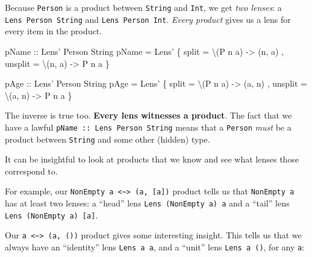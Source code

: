 \documentclass[]{article}
\newenvironment{Shaded}{}{}
\newcommand{\DataTypeTok}[1]{\textcolor[rgb]{0.56,0.13,0.00}{#1}}
\newcommand{\FunctionTok}[1]{\textcolor[rgb]{0.02,0.16,0.49}{#1}}
\newcommand{\NormalTok}[1]{#1}
\newcommand{\OtherTok}[1]{\textcolor[rgb]{0.00,0.44,0.13}{#1}}
\begin{document}
Because \texttt{Person} is a product between \texttt{String} and \texttt{Int},
we get \emph{two lenses}: a \texttt{Lens\textquotesingle{}\ Person\ String} and
\texttt{Lens\textquotesingle{}\ Person\ Int}. \emph{Every product} gives us a
lens for every item in the product.

\begin{Shaded}
\begin{Highlighting}[]
\OtherTok{pName ::} \DataTypeTok{Lens'} \DataTypeTok{Person} \DataTypeTok{String}
\NormalTok{pName }\FunctionTok{=} \DataTypeTok{Lens'}\NormalTok{ \{ split   }\FunctionTok{=}\NormalTok{ \textbackslash{}(}\DataTypeTok{P}\NormalTok{ n a) }\OtherTok{->}\NormalTok{ (n, a)}
\NormalTok{              , unsplit }\FunctionTok{=}\NormalTok{ \textbackslash{}(n, a)  }\OtherTok{->} \DataTypeTok{P}\NormalTok{ n a}
\NormalTok{              \}}

\OtherTok{pAge ::} \DataTypeTok{Lens'} \DataTypeTok{Person} \DataTypeTok{String}
\NormalTok{pAge }\FunctionTok{=} \DataTypeTok{Lens'}\NormalTok{ \{ split   }\FunctionTok{=}\NormalTok{ \textbackslash{}(}\DataTypeTok{P}\NormalTok{ n a) }\OtherTok{->}\NormalTok{ (a, n)}
\NormalTok{             , unsplit }\FunctionTok{=}\NormalTok{ \textbackslash{}(a, n)  }\OtherTok{->} \DataTypeTok{P}\NormalTok{ n a}
\NormalTok{             \}}
\end{Highlighting}
\end{Shaded}

The inverse is true too. \textbf{Every lens witnesses a product}. The fact that
we have a lawful \texttt{pName\ ::\ Lens\textquotesingle{}\ Person\ String}
means that a \texttt{Person} \emph{must} be a product between \texttt{String}
and some other (hidden) type.

It can be insightful to look at products that we know and see what lenses those
correspond to.

For example, our
\texttt{NonEmpty\ a\ \textless{}\textasciitilde{}\textgreater{}\ (a,\ {[}a{]})}
product tells us that \texttt{NonEmpty\ a} has at least two lenses: a ``head''
lens \texttt{Lens\textquotesingle{}\ (NonEmpty\ a)\ a} and a ``tail'' lens
\texttt{Lens\textquotesingle{}\ (NonEmpty\ a)\ {[}a{]}}.

Our \texttt{a\ \textless{}\textasciitilde{}\textgreater{}\ (a,\ ())} product
gives some interesting insight. This tells us that we always have an
``identity'' lens \texttt{Lens\textquotesingle{}\ a\ a}, and a ``unit'' lens
\texttt{Lens\textquotesingle{}\ a\ ()}, for any \texttt{a}:
\end{document}
